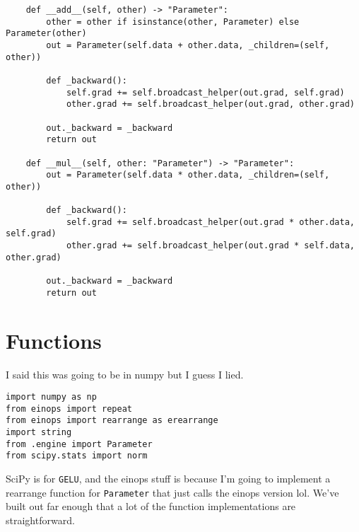 \documentclass[11pt]{article}
\begin{document}
\begin{verbatim}
    def __add__(self, other) -> "Parameter":
        other = other if isinstance(other, Parameter) else Parameter(other)
        out = Parameter(self.data + other.data, _children=(self, other))

        def _backward():
            self.grad += self.broadcast_helper(out.grad, self.grad)
            other.grad += self.broadcast_helper(out.grad, other.grad)

        out._backward = _backward
        return out

    def __mul__(self, other: "Parameter") -> "Parameter":
        out = Parameter(self.data * other.data, _children=(self, other))

        def _backward():
            self.grad += self.broadcast_helper(out.grad * other.data, self.grad)
            other.grad += self.broadcast_helper(out.grad * self.data, other.grad)

        out._backward = _backward
        return out
\end{verbatim}
\section{Functions}
I said this was going to be in numpy but I guess I lied. 
\begin{verbatim}
import numpy as np
from einops import repeat
from einops import rearrange as erearrange
import string
from .engine import Parameter
from scipy.stats import norm
\end{verbatim}
SciPy is for \texttt{GELU}, and the einops stuff is because I'm going to implement a rearrange function for 
\texttt{Parameter} that just calls the einops version lol. We've built out far enough that a lot of the function
implementations are straightforward. 
\end{document}
